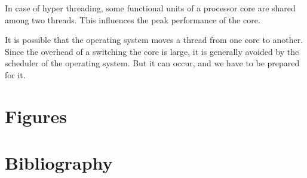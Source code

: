 \documentclass[a4paper,12pt]{article}
\begin{document}
In case of hyper threading, some functional units of a processor core are shared
among two threads. This influences the peak performance of the core.

It is possible that the operating system moves a thread from one core to
another. Since the overhead of a switching the core is large, it is generally
avoided by the scheduler of the operating system. But it can occur, and we have
to be prepared for it.

\section{Figures}
\listoffigures

\section{Bibliography}


\end{document}
